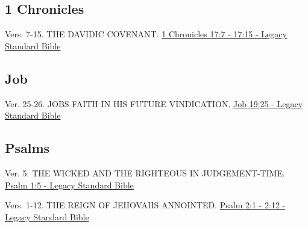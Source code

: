 \documentclass[
  ignorenonframetext,
]{beamer}
\begin{document}
\subsection{1 Chronicles}\label{chronicles}

\begin{frame}{17}
\label{section-13}
\begin{block}{Vers. 7-15. THE DAVIDIC COVENANT.}
\label{vers.-7-15.-the-davidic-covenant.}
\href{https://read.lsbible.org/?q=1chron17\%3A7-15}{1 Chronicles 17:7 -
17:15 - Legacy Standard Bible}
\end{block}
\end{frame}

\subsection{Job}\label{job}

\begin{frame}{19}
\label{section-14}
\begin{block}{Ver. 25-26. JOB\textquotesingle S FAITH IN HIS FUTURE
VINDICATION.}
\label{ver.-25-26.-jobs-faith-in-his-future-vindication.}
\href{https://read.lsbible.org/?q=job19\%3A25-25}{Job 19:25 - Legacy
Standard Bible}
\end{block}
\end{frame}

\subsection{Psalms}\label{psalms}

\begin{frame}{1}
\label{section-15}
\begin{block}{Ver. 5. THE WICKED AND THE RIGHTEOUS IN JUDGEMENT-TIME.}
\label{ver.-5.-the-wicked-and-the-righteous-in-judgement-time.}
\href{https://read.lsbible.org/?q=ps1\%3A5}{Psalm 1:5 - Legacy Standard
Bible}
\end{block}
\end{frame}

\begin{frame}{2}
\label{section-16}
\begin{block}{Vers. 1-12. THE REIGN OF JEHOVAH\textquotesingle S
ANNOINTED.}
\label{vers.-1-12.-the-reign-of-jehovahs-annointed.}
\href{https://read.lsbible.org/?q=ps2\%3A1-12}{Psalm 2:1 - 2:12 - Legacy
Standard Bible}
\end{block}
\end{frame}
\end{document}
